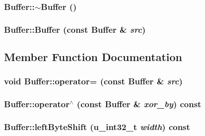 \subsubsection{\setlength{\rightskip}{0pt plus 5cm}Buffer::$\sim$Buffer ()\hspace{0.3cm}{\tt  [virtual]}}\label{classBuffer_59b8743e4a5f731bdd0c4185c9ef263b}


\subsubsection{\setlength{\rightskip}{0pt plus 5cm}Buffer::Buffer (const {\bf Buffer} \& {\em src})}\label{classBuffer_042fe5bc1f8d0c25d5707d6955d1654c}




\subsection{Member Function Documentation}
\subsubsection{\setlength{\rightskip}{0pt plus 5cm}void Buffer::operator= (const {\bf Buffer} \& {\em src})}\label{classBuffer_14cec0d3bf4f3f1a4a9930a8c53eb43a}


\subsubsection{ Buffer::operator$^\wedge$ (const {\bf Buffer} \& {\em xor\_\-by}) const\hspace{0.3cm}{\tt  [virtual]}}\label{classBuffer_d56159a415541fcff34ef8aed1eb7183}


\subsubsection{ Buffer::left\-Byte\-Shift ({\bf u\_\-int32\_\-t} {\em width}) const\hspace{0.3cm}{\tt  [virtual]}}\label{classBuffer_13200a4925b1b3c08f99e09ccb6854a1}


